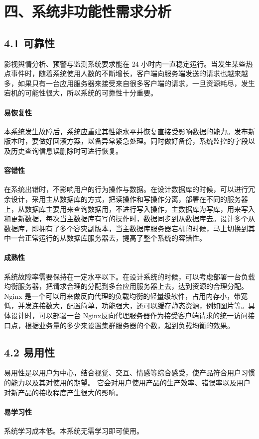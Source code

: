 \section{四、系统非功能性需求分析}
\subsection{4.1 可靠性}
影视舆情分析、预警与监测系统要求能在 24 小时内一直稳定运行。当发生某些热点事件时，随着系统使用人数的不断增长，客户端向服务端发送的请求也越来越多，如果只有一台应用服务器来接受来自很多客户端的请求，一旦资源耗尽，发生宕机的可能性很大，所以系统的可靠性十分重要。
\paragraph{易恢复性}
本系统发生故障后，系统应重建其性能水平并恢复直接受影响数据的能力。发布新版本时，要做好回滚方案，以备异常紧急处理。同时做好备份，系统监控的字段以及历史查询信息误删除时可进行恢复。
\paragraph{容错性}
在系统出错时，不影响用户的行为操作与数据。在设计数据库的时候，可以进行冗余设计，采用主从数据库的方式，把读操作和写操作分离，部署在不同的服务器上，从数据库主要用来查询数据用，不进行写入操作，主数据库为写库，用来写入和更新数据，每次当主数据库有写的操作时，数据同步到从数据库去。设计多个从数据库，即拥有了多个容灾副版本，当主数据库服务器宕机的时候，马上切换到其中一台正常运行的从数据库服务器去，提高了整个系统的容错性。
\paragraph{成熟性}
系统故障率需要保持在一定水平以下。在设计系统的时候，可以考虑部署一台负载均衡服务器，把请求合理的分配到多台应用服务器上去，达到资源的合理分配。Nginx 是一个可以用来做反向代理的负载均衡的轻量级软件，占用内存小，带宽低，并发连接数大，配置简单，功能强大，还可以缓存静态资源，例如图片等。具体设计时，可以部署一台 Nginx反向代理服务器作为接受客户端请求的统一访问接口点，根据业务量的多少来设置集群服务器的个数，起到负载均衡的效果。

\subsection{4.2 易用性}
易用性是以用户为中心，结合视觉、交互、情感等综合感受，使产品符合用户习惯的能力以及其对使用的期望。 它会对用户使用产品的生产效率、错误率以及用户对新产品的接收程度产生很大的影响。
\paragraph{易学习性}
系统学习成本低。本系统无需学习即可使用。
